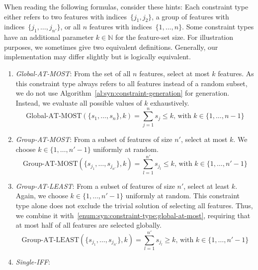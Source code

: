 When reading the following formulas, consider these hints:
Each constraint type either refers to two features with indices~$\{j_1, j_2\}$, a group of features with indices~$\{j_1, \dots, j_{n'}\}$, or all $n$ features with indices~$\{1, \dots, n\}$.
Some constraint types have an additional parameter $k \in \mathbb{N}$ for the feature-set size.
For illustration purposes, we sometimes give two equivalent definitions.
Generally, our implementation may differ slightly but is logically equivalent.
%
\begin{enumerate}[label=(T\arabic*), wide, noitemsep]
	\item\label{enum:syn:constraint-type:global-at-most} \emph{Global-AT-MOST}:
	From the set of all $n$ features, select at most $k$ features.
	As this constraint type always refers to all features instead of a random subset, we do not use Algorithm~\ref{al:syn:constraint-generation} for generation.
	Instead, we evaluate all possible values of $k$ exhaustively.
	\begin{equation}
		\text{Global-AT-MOST}(\{s_1, \dots, s_n\}, k) = \sum_{j=1}^{n} s_j \leq k \text{, with } k \in \{1, \dots, n-1\}
		\label{eq:syn:constraint:global-at-most}
	\end{equation}
	\item\label{enum:syn:constraint-type:group-at-most} \emph{Group-AT-MOST}:
	From a subset of features of size $n'$, select at most $k$.
	We choose $k \in \{1, \dots, n'-1\}$ uniformly at random.
	\begin{equation}
		\text{Group-AT-MOST}(\{s_{j_1}, \dots, s_{j_{n'}}\}, k) = \sum_{l=1}^{n'} s_{j_l} \leq k \text{, with } k \in \{1, \dots, n'-1\}
		\label{eq:syn:constraint:group-at-most}
	\end{equation}
	\item\label{enum:syn:constraint-type:group-at-least} \emph{Group-AT-LEAST}:
	From a subset of features of size $n'$, select at least $k$.
	Again, we choose $k \in \{1, \dots, n'-1\}$ uniformly at random.
	This constraint type alone does not exclude the trivial solution of selecting all features.
	Thus, we combine it with~\ref{enum:syn:constraint-type:global-at-most}, requiring that at most half of all features are selected globally.
	\begin{equation}
		\text{Group-AT-LEAST}(\{s_{j_1}, \dots, s_{j_{n'}}\}, k) = \sum_{l=1}^{n'} s_{j_l} \geq k \text{, with } k \in \{1, \dots, n'-1\}
		\label{eq:syn:constraint:group-at-least}
	\end{equation}
	\item\label{enum:syn:constraint-type:single-iff} \emph{Single-IFF}:

\end{enumerate}
